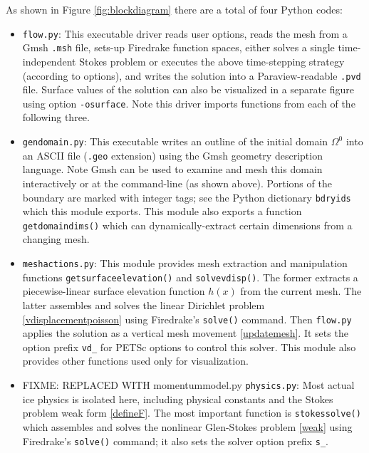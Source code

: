 \documentclass[letterpaper,final,12pt,reqno]{amsart}
\begin{document}
\medskip
As shown in Figure \ref{fig:blockdiagram} there are a total of four Python codes:
\begin{itemize}
\item \texttt{flow.py}: \quad  This executable driver reads user options, reads the mesh from a Gmsh \texttt{.msh} file, sets-up Firedrake function spaces, either solves a single time-independent Stokes problem or executes the above time-stepping strategy (according to options), and writes the solution into a Paraview-readable \texttt{.pvd} file.  Surface values of the solution can also be visualized in a separate figure using option \texttt{-osurface}.  Note this driver imports functions from each of the following three.

\item \texttt{gendomain.py}: \quad  This executable writes an outline of the initial domain $\Omega^0$ into an ASCII file (\texttt{.geo} extension) using the Gmsh \cite{GeuzaineRemacle2009} geometry description language.  Note Gmsh can be used to examine and mesh this domain interactively or at the command-line (as shown above).  Portions of the boundary are marked with integer tags; see the Python dictionary \texttt{bdryids} which this module exports.  This module also exports a function \texttt{getdomaindims()} which can dynamically-extract certain dimensions from a changing mesh.

\item \texttt{meshactions.py}: \quad  This module provides mesh extraction and manipulation functions \texttt{getsurfaceelevation()} and \texttt{solvevdisp()}.  The former extracts a piecewise-linear surface elevation function $h(x)$ from the current mesh.  The latter assembles and solves the linear Dirichlet problem \eqref{vdisplacementpoisson} using Firedrake's \texttt{solve()} command.  Then \texttt{flow.py} applies the solution as a vertical mesh movement \eqref{updatemesh}.  It sets the option prefix \texttt{vd\_} for PETSc options to control this solver.  This module also provides other functions used only for visualization.

\item FIXME: REPLACED WITH momentummodel.py \texttt{physics.py}: \quad  Most actual ice physics is isolated here, including physical constants and the Stokes problem weak form \eqref{defineF}.  The most important function is \texttt{stokessolve()} which assembles and solves the nonlinear Glen-Stokes problem \eqref{weak} using Firedrake's \texttt{solve()} command; it also sets the solver option prefix \texttt{s\_}.
\end{itemize}
\end{document}
